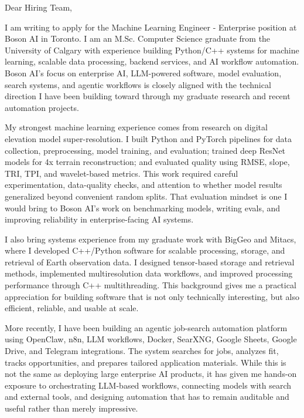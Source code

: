 \documentclass[11pt]{letter}
\begin{document}
\begin{letter}{}

\opening{Dear Hiring Team,}

I am writing to apply for the Machine Learning Engineer - Enterprise position at Boson AI in Toronto. I am an M.Sc. Computer Science graduate from the University of Calgary with experience building Python/C++ systems for machine learning, scalable data processing, backend services, and AI workflow automation. Boson AI's focus on enterprise AI, LLM-powered software, model evaluation, search systems, and agentic workflows is closely aligned with the technical direction I have been building toward through my graduate research and recent automation projects.

My strongest machine learning experience comes from research on digital elevation model super-resolution. I built Python and PyTorch pipelines for data collection, preprocessing, model training, and evaluation; trained deep ResNet models for 4x terrain reconstruction; and evaluated quality using RMSE, slope, TRI, TPI, and wavelet-based metrics. This work required careful experimentation, data-quality checks, and attention to whether model results generalized beyond convenient random splits. That evaluation mindset is one I would bring to Boson AI's work on benchmarking models, writing evals, and improving reliability in enterprise-facing AI systems.

I also bring systems experience from my graduate work with BigGeo and Mitacs, where I developed C++/Python software for scalable processing, storage, and retrieval of Earth observation data. I designed tensor-based storage and retrieval methods, implemented multiresolution data workflows, and improved processing performance through C++ multithreading. This background gives me a practical appreciation for building software that is not only technically interesting, but also efficient, reliable, and usable at scale.

More recently, I have been building an agentic job-search automation platform using OpenClaw, n8n, LLM workflows, Docker, SearXNG, Google Sheets, Google Drive, and Telegram integrations. The system searches for jobs, analyzes fit, tracks opportunities, and prepares tailored application materials. While this is not the same as deploying large enterprise AI products, it has given me hands-on exposure to orchestrating LLM-based workflows, connecting models with search and external tools, and designing automation that has to remain auditable and useful rather than merely impressive.


\end{letter}
\end{document}
